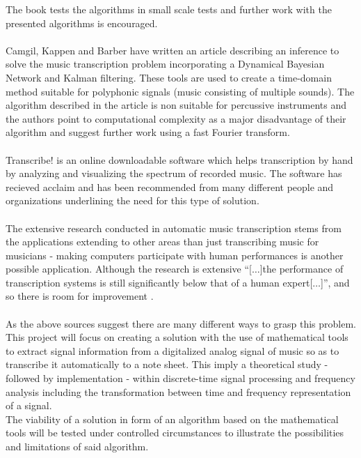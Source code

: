 The book tests the algorithms in small scale tests and further work with the presented algorithms is encouraged.
\\\\
Camgil, Kappen and Barber have written an article \cite{sol2} describing an inference to solve the music transcription problem incorporating a Dynamical Bayesian Network and Kalman filtering.
These tools are used to create a time-domain method suitable for polyphonic signals (music consisting of multiple sounds). 
The algorithm described in the article is non suitable for percussive instruments and the authors point to computational complexity as a major disadvantage of their algorithm and suggest further work using a fast Fourier transform.
\\\\
Transcribe! \cite{transcribe!} is an online downloadable software which helps transcription by hand by analyzing and visualizing the spectrum of recorded music. The software has recieved acclaim and has been recommended from many different people and organizations underlining the need for this type of solution.
\\\\
The extensive research conducted in automatic music transcription stems from the applications extending to other areas than just transcribing music for musicians - making computers participate with human performances is another possible application. Although the research is extensive ``[$\ldots$]the performance of transcription systems is still significantly below that of a human expert[$\ldots$]'', and so there is room for improvement \cite{future}.
\\\\
As the above sources suggest there are many different ways to grasp this problem.\\
This project will focus on creating a solution with the use of mathematical tools to extract signal information from a digitalized analog signal of music so as to transcribe it automatically to a note sheet.  
This imply a theoretical study - followed by implementation - within discrete-time signal processing and frequency analysis including the transformation between time and frequency representation of a signal.\\    
The viability of a solution in form of an algorithm based on the mathematical tools will be tested under controlled circumstances to illustrate the possibilities and limitations of said algorithm. 

